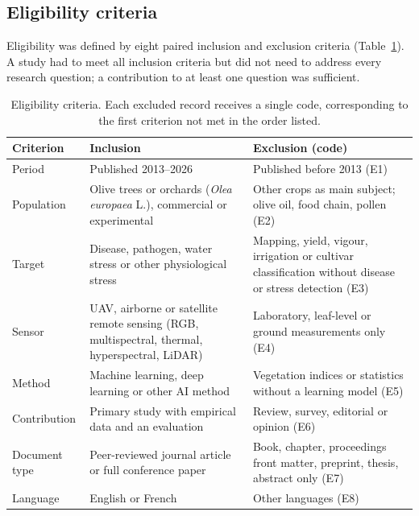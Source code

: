 \documentclass[preprint,12pt]{elsarticle}
\begin{document}
\subsection{Eligibility criteria}
Eligibility was defined by eight paired inclusion and exclusion criteria (Table~\ref{tab:criteria}). A study had to meet all inclusion criteria but did not need to address every research question; a contribution to at least one question was sufficient.
\begin{table}[H]\centering\caption{Eligibility criteria. Each excluded record receives a single code, corresponding to the first criterion not met in the order listed.}\label{tab:criteria}\small
\begin{tabular}{@{}p{1.97cm}p{5.23cm}p{5.23cm}@{}}\toprule
Criterion & Inclusion & Exclusion (code)\\\midrule
Period & Published 2013--2026 & Published before 2013 (E1)\\
Population & Olive trees or orchards (\textit{Olea europaea} L.), commercial or experimental & Other crops as main subject; olive oil, food chain, pollen (E2)\\
Target & Disease, pathogen, water stress or other physiological stress & Mapping, yield, vigour, irrigation or cultivar classification without disease or stress detection (E3)\\
Sensor & UAV, airborne or satellite remote sensing (RGB, multispectral, thermal, hyperspectral, LiDAR) & Laboratory, leaf-level or ground measurements only (E4)\\
Method & Machine learning, deep learning or other AI method & Vegetation indices or statistics without a learning model (E5)\\
Contribution & Primary study with empirical data and an evaluation & Review, survey, editorial or opinion (E6)\\
Document type & Peer-reviewed journal article or full conference paper & Book, chapter, proceedings front matter, preprint, thesis, abstract only (E7)\\
Language & English or French & Other languages (E8)\\\bottomrule
\end{tabular}\end{table}
 
\end{document}
